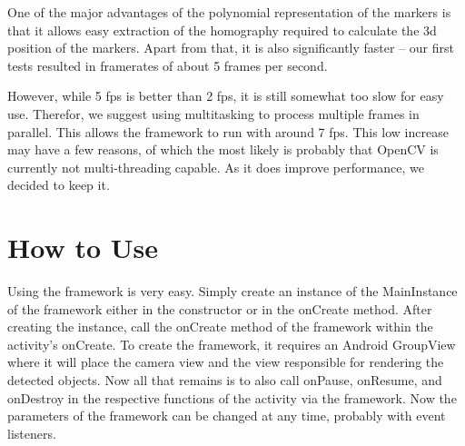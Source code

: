One of the major advantages of the polynomial representation of the markers is that it allows easy extraction of the homography required to calculate the 3d position of the markers.
Apart from that, it is also significantly faster – our first tests resulted in framerates of about 5 frames per second.

However, while 5 fps is better than 2 fps, it is still somewhat too slow for easy use.
Therefor, we suggest using multitasking to process multiple frames in parallel.
This allows the framework to run with around 7 fps.
This low increase may have a few reasons, of which the most likely is probably that OpenCV is currently not multi-threading capable.
As it does improve performance, we decided to keep it.

\section{How to Use}

Using the framework is very easy.
Simply create an instance of the MainInstance of the framework either in the constructor or in the onCreate method.
After creating the instance, call the onCreate method of the framework within the activity's onCreate.
To create the framework, it requires an Android GroupView where it will place the camera view and the view responsible for rendering the detected objects.
Now all that remains is to also call onPause, onResume, and onDestroy in the respective functions of the activity via the framework.
Now the parameters of the framework can be changed at any time, probably with event listeners.
